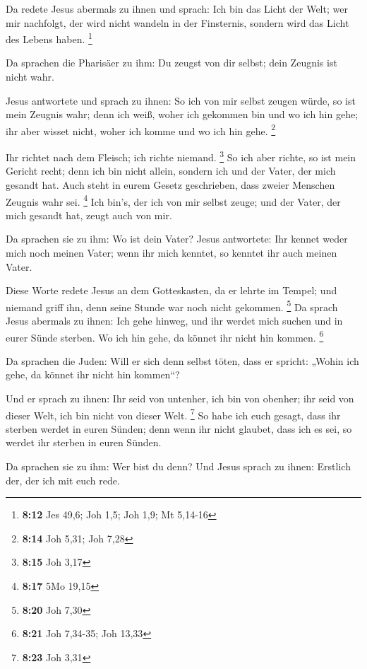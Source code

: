  Da redete Jesus abermals zu ihnen und sprach: Ich bin
das Licht der Welt; wer mir nachfolgt, der wird nicht wandeln in der
Finsternis, sondern wird das Licht des Lebens haben. \footnote{\textbf{8:12}
  Jes 49,6; Joh 1,5; Joh 1,9; Mt 5,14-16}

 Da sprachen die Pharisäer zu ihm: Du zeugst von dir
selbst; dein Zeugnis ist nicht wahr.

 Jesus antwortete und sprach zu ihnen: So ich von mir
selbst zeugen würde, so ist mein Zeugnis wahr; denn ich weiß, woher ich
gekommen bin und wo ich hin gehe; ihr aber wisset nicht, woher ich komme
und wo ich hin gehe. \footnote{\textbf{8:14} Joh 5,31; Joh 7,28}

 Ihr richtet nach dem Fleisch; ich richte niemand.
\footnote{\textbf{8:15} Joh 3,17}  So ich aber richte, so
ist mein Gericht recht; denn ich bin nicht allein, sondern ich und der
Vater, der mich gesandt hat.  Auch steht in eurem Gesetz
geschrieben, dass zweier Menschen Zeugnis wahr sei. \footnote{\textbf{8:17}
  5Mo 19,15}  Ich bin's, der ich von mir selbst zeuge;
und der Vater, der mich gesandt hat, zeugt auch von mir.

 Da sprachen sie zu ihm: Wo ist dein Vater? Jesus
antwortete: Ihr kennet weder mich noch meinen Vater; wenn ihr mich
kenntet, so kenntet ihr auch meinen Vater.

 Diese Worte redete Jesus an dem Gotteskasten, da er
lehrte im Tempel; und niemand griff ihn, denn seine Stunde war noch
nicht gekommen. \footnote{\textbf{8:20} Joh 7,30}  Da
sprach Jesus abermals zu ihnen: Ich gehe hinweg, und ihr werdet mich
suchen und in eurer Sünde sterben. Wo ich hin gehe, da könnet ihr nicht
hin kommen. \footnote{\textbf{8:21} Joh 7,34-35; Joh 13,33}

 Da sprachen die Juden: Will er sich denn selbst töten,
dass er spricht: „Wohin ich gehe, da könnet ihr nicht hin kommen``?

 Und er sprach zu ihnen: Ihr seid von untenher, ich bin
von obenher; ihr seid von dieser Welt, ich bin nicht von dieser Welt.
\footnote{\textbf{8:23} Joh 3,31}  So habe ich euch
gesagt, dass ihr sterben werdet in euren Sünden; denn wenn ihr nicht
glaubet, dass ich es sei, so werdet ihr sterben in euren Sünden.

 Da sprachen sie zu ihm: Wer bist du denn? Und Jesus
sprach zu ihnen: Erstlich der, der ich mit euch rede.

